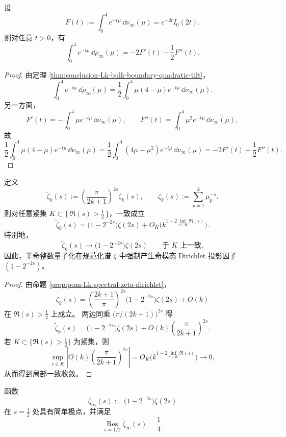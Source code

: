 \begin{corollary}\label{cor:conclusion-Lk-boundary-heat-as-bulk-differential}
设
\[
F(t):=\int_0^4 e^{-t\mu}\,\dd\nu_\infty(\mu)=e^{-2t}I_0(2t).
\]
则对任意 \(t>0\)，有
\[
\int_0^4 e^{-t\mu}\,\dd\rho_\infty(\mu)
=
-2F'(t)-\frac12F''(t).
\]
\end{corollary}

\begin{proof}
由定理 \ref{thm:conclusion-Lk-bulk-boundary-quadratic-tilt}，
\[
\int_0^4 e^{-t\mu}\,\dd\rho_\infty(\mu)
=
\frac12\int_0^4 \mu(4-\mu)e^{-t\mu}\,\dd\nu_\infty(\mu).
\]
另一方面，
\[
F'(t)=-\int_0^4 \mu e^{-t\mu}\,\dd\nu_\infty(\mu),
\qquad
F''(t)=\int_0^4 \mu^2 e^{-t\mu}\,\dd\nu_\infty(\mu),
\]
故
\[
\frac12\int_0^4 \mu(4-\mu)e^{-t\mu}\,\dd\nu_\infty(\mu)
=
\frac12\int_0^4 (4\mu-\mu^2)e^{-t\mu}\,\dd\nu_\infty(\mu)
=
-2F'(t)-\frac12F''(t).
\]
\end{proof}

\begin{theorem}\label{thm:conclusion-Lk-normalized-zeta-odd-projector}
定义
\[
\widetilde\zeta_k(s):=
\left(\frac{\pi}{2k+1}\right)^{2s}\zeta_k(s),
\qquad
\zeta_k(s):=\sum_{p=1}^k \mu_p^{-s}.
\]
则对任意紧集 \(K\subset\{\,\Re(s)>\tfrac12\,\}\)，一致成立
\[
\widetilde\zeta_k(s)
=
\bigl(1-2^{-2s}\bigr)\zeta(2s)+O_K\!\bigl(k^{1-2\inf_{s\in K}\Re(s)}\bigr).
\]
特别地，
\[
\widetilde\zeta_k(s)\longrightarrow \bigl(1-2^{-2s}\bigr)\zeta(2s)
\qquad
\text{于 }K\text{ 上一致}.
\]
因此，半奇整数量子化在规范化谱 \(\zeta\) 中强制产生奇模态 Dirichlet 投影因子 \((1-2^{-2s})\)。
\end{theorem}

\begin{proof}
由命题 \ref{prop:pom-Lk-spectral-zeta-dirichlet}，
\[
\zeta_k(s)
=
\left(\frac{2k+1}{\pi}\right)^{2s}\bigl(1-2^{-2s}\bigr)\zeta(2s)+O(k)
\]
在 \(\Re(s)>\tfrac12\) 上成立。
两边同乘 \(\bigl(\pi/(2k+1)\bigr)^{2s}\) 得
\[
\widetilde\zeta_k(s)
=
\bigl(1-2^{-2s}\bigr)\zeta(2s)
+
O(k)\left(\frac{\pi}{2k+1}\right)^{2s}.
\]
若 \(K\subset\{\Re(s)>\tfrac12\}\) 为紧集，则
\[
\sup_{s\in K}\left|O(k)\left(\frac{\pi}{2k+1}\right)^{2s}\right|
=
O_K\!\bigl(k^{1-2\inf_{s\in K}\Re(s)}\bigr)\to 0,
\]
从而得到局部一致收敛。
\end{proof}

\begin{corollary}[规范化 hard-edge 谱 \texorpdfstring{\(\zeta\)}{zeta} 在 \texorpdfstring{$s=\tfrac12$}{s=1/2} 的留数]\label{cor:conclusion-Lk-normalized-zeta-residue-quarter}
函数
\[
\widetilde\zeta_\infty(s):=\bigl(1-2^{-2s}\bigr)\zeta(2s)
\]
在 \(s=\tfrac12\) 处具有简单极点，并满足
\[
\operatorname*{Res}_{s=1/2}\widetilde\zeta_\infty(s)=\frac14.
\]
\end{corollary}

